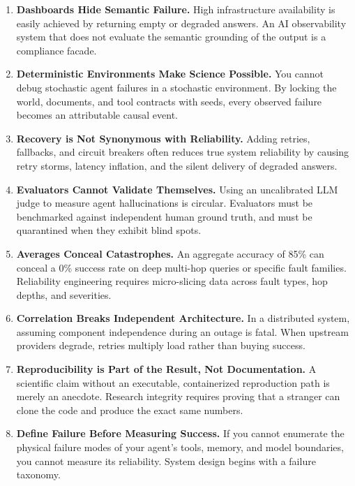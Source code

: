 \begin{enumerate}
    \item \textbf{Dashboards Hide Semantic Failure.} High infrastructure availability is easily achieved by returning empty or degraded answers. An AI observability system that does not evaluate the semantic grounding of the output is a compliance facade.
    
    \item \textbf{Deterministic Environments Make Science Possible.} You cannot debug stochastic agent failures in a stochastic environment. By locking the world, documents, and tool contracts with seeds, every observed failure becomes an attributable causal event.
    
    \item \textbf{Recovery is Not Synonymous with Reliability.} Adding retries, fallbacks, and circuit breakers often reduces true system reliability by causing retry storms, latency inflation, and the silent delivery of degraded answers.
    
    \item \textbf{Evaluators Cannot Validate Themselves.} Using an uncalibrated LLM judge to measure agent hallucinations is circular. Evaluators must be benchmarked against independent human ground truth, and must be quarantined when they exhibit blind spots.
    
    \item \textbf{Averages Conceal Catastrophes.} An aggregate accuracy of 85\% can conceal a 0\% success rate on deep multi-hop queries or specific fault families. Reliability engineering requires micro-slicing data across fault types, hop depths, and severities.
    
    \item \textbf{Correlation Breaks Independent Architecture.} In a distributed system, assuming component independence during an outage is fatal. When upstream providers degrade, retries multiply load rather than buying success.
    
    \item \textbf{Reproducibility is Part of the Result, Not Documentation.} A scientific claim without an executable, containerized reproduction path is merely an anecdote. Research integrity requires proving that a stranger can clone the code and produce the exact same numbers.
    
    \item \textbf{Define Failure Before Measuring Success.} If you cannot enumerate the physical failure modes of your agent's tools, memory, and model boundaries, you cannot measure its reliability. System design begins with a failure taxonomy.
\end{enumerate}
